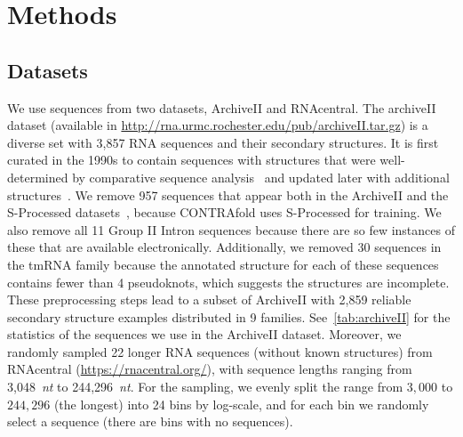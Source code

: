 

\section*{Methods}

\small

\subsection*{Datasets}

We use sequences from two datasets, ArchiveII and RNAcentral.
The archiveII dataset 
(available in \url{http://rna.urmc.rochester.edu/pub/archiveII.tar.gz}) is %
a diverse set with 3,857 RNA sequences and their secondary structures.
It is first curated in the 1990s to contain sequences with structures that were well-determined by comparative sequence analysis~\cite{mathews+:1999}%
and updated later with additional structures~\cite{sloma+mathews:2016}. %
We remove 957 sequences that appear both in the ArchiveII and the S-Processed datasets~\cite{Andronescu+:2007}, because CONTRAfold uses S-Processed for training. 
We also remove all 11 Group II Intron sequences 
because there are so few instances of these that are available electronically.
Additionally, we removed 30 sequences in the tmRNA family because the annotated structure for each of these sequences contains fewer than 4 pseudoknots, 
which suggests the structures are incomplete. 
These preprocessing steps lead to a subset of ArchiveII with 2,859 reliable secondary structure 
examples 
distributed in 9 families. 
See~\ref{tab:archiveII} for the statistics of the sequences we use in the ArchiveII dataset.
Moreover, we randomly sampled 22 longer RNA sequences (without known structures) from RNAcentral 
(\url{https://rnacentral.org/}),
with sequence lengths ranging from 3,048~{\it nt} to 244,296~{\it nt}.
For the sampling, we evenly split the range from $3,000$ to $244,296$ (the longest) into 24 bins by log-scale, and for each bin we
randomly select a sequence (there are bins with
no sequences).

